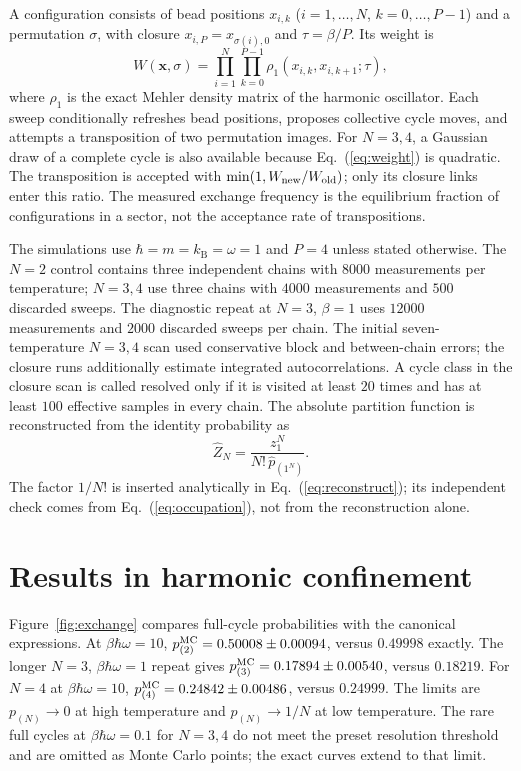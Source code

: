 \documentclass[aps,pra,reprint,floatfix,amsmath,amssymb,groupedaddress]{revtex4-2}
\begin{document}
A configuration consists of bead positions $x_{i,k}$ ($i=1,\ldots,N$, $k=0,\ldots,P-1$) and a permutation $\sigma$, with closure $x_{i,P}=x_{\sigma(i),0}$ and $\tau=\beta/P$. Its weight is
\begin{equation}
W(\bm{x},\sigma)=\prod_{i=1}^{N}\prod_{k=0}^{P-1}
\rho_1(x_{i,k},x_{i,k+1};\tau),
\label{eq:weight}
\end{equation}
where $\rho_1$ is the exact Mehler density matrix of the harmonic oscillator. Each sweep conditionally refreshes bead positions, proposes collective cycle moves, and attempts a transposition of two permutation images. For $N=3,4$, a Gaussian draw of a complete cycle is also available because Eq.~(\ref{eq:weight}) is quadratic. The transposition is accepted with $\min(1,W_{\rm new}/W_{\rm old})$; only its closure links enter this ratio. The measured exchange frequency is the equilibrium fraction of configurations in a sector, not the acceptance rate of transpositions.

The simulations use $\hbar=m=k_{\mathrm B}=\omega=1$ and $P=4$ unless stated otherwise. The $N=2$ control contains three independent chains with $8000$ measurements per temperature; $N=3,4$ use three chains with $4000$ measurements and $500$ discarded sweeps. The diagnostic repeat at $N=3$, $\beta=1$ uses $12000$ measurements and $2000$ discarded sweeps per chain. The initial seven-temperature $N=3,4$ scan used conservative block and between-chain errors; the closure runs additionally estimate integrated autocorrelations. A cycle class in the closure scan is called resolved only if it is visited at least $20$ times and has at least $100$ effective samples in every chain. The absolute partition function is reconstructed from the identity probability as
\begin{equation}
\widehat Z_N=\frac{z_1^N}{N!\,\widehat p_{(1^N)}}.
\label{eq:reconstruct}
\end{equation}
The factor $1/N!$ is inserted analytically in Eq.~(\ref{eq:reconstruct}); its independent check comes from Eq.~(\ref{eq:occupation}), not from the reconstruction alone.

\section{Results in harmonic confinement}

Figure~\ref{fig:exchange} compares full-cycle probabilities with the canonical expressions. At $\beta\hbar\omega=10$, $p_{(2)}^{\rm MC}=0.50008\pm0.00094$, versus $0.49998$ exactly. The longer $N=3$, $\beta\hbar\omega=1$ repeat gives $p_{(3)}^{\rm MC}=0.17894\pm0.00540$, versus $0.18219$. For $N=4$ at $\beta\hbar\omega=10$, $p_{(4)}^{\rm MC}=0.24842\pm0.00486$, versus $0.24999$. The limits are $p_{(N)}\to0$ at high temperature and $p_{(N)}\to1/N$ at low temperature. The rare full cycles at $\beta\hbar\omega=0.1$ for $N=3,4$ do not meet the preset resolution threshold and are omitted as Monte Carlo points; the exact curves extend to that limit.
\end{document}

